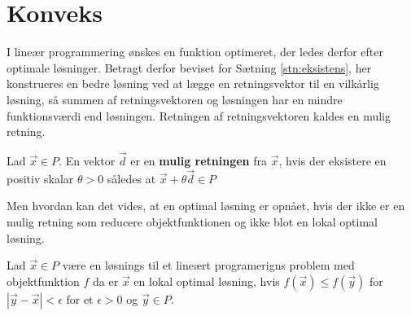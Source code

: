 \section{Konveks}
I lineær programmering ønskes en funktion optimeret, der ledes derfor efter optimale løsninger.
Betragt derfor beviset for Sætning \ref{stn:eksistens}, her konstrueres en bedre løsning ved at lægge en retningsvektor til en vilkårlig løsning, så summen af retningsvektoren og løsningen har en mindre funktionsværdi end løsningen. 
Retningen af retningsvektoren kaldes en mulig retning.
\begin{defn}
Lad $\vec{x} \in P$. En vektor $\vec{d}$ er en \textbf{mulig retningen} fra $\vec{x}$, hvis der eksistere en positiv skalar $\theta > 0$ således at $\vec{x}+\theta\vec{d} \in P$ 
\end{defn}
Men hvordan kan det vides, at en optimal løsning er opnået, hvis der ikke er en mulig retning som reducere objektfunktionen og ikke blot en lokal optimal løsning.
\begin{defn}
Lad $\vec{x} \in P$ være en løsnings til et lineært programerigns problem med objektfunktion $f$ da er $\vec{x}$ en lokal optimal løsning, hvis $f(\vec{x}) \leq f(\vec{y})$ for $|\vec{y}-\vec{x}|< \epsilon$ for et $\epsilon > 0$ og $\vec{y} \in P$.
\end{defn}





